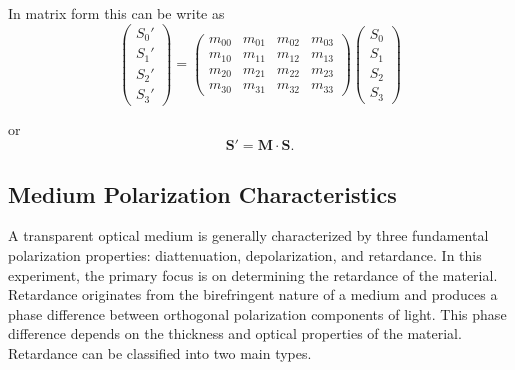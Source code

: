 In matrix form this can be write as 
\begin{equation}
\begin{pmatrix}
S_0' \\
S_1' \\
S_2' \\
S_3'
\end{pmatrix}
=
\begin{pmatrix}
m_{00} & m_{01} & m_{02} & m_{03} \\
m_{10} & m_{11} & m_{12} & m_{13} \\
m_{20} & m_{21} & m_{22} & m_{23} \\
m_{30} & m_{31} & m_{32} & m_{33}
\end{pmatrix}
\begin{pmatrix}
S_0 \\
S_1 \\
S_2 \\
S_3
\end{pmatrix}
\end{equation}

or
\begin{equation}
\mathbf{S}' = \mathbf{M}\cdot \mathbf{S}.
\end{equation}

\subsection{Medium Polarization Characteristics}

A transparent optical medium is generally characterized by three
fundamental polarization properties: diattenuation, depolarization, and retardance. In this experiment, the primary focus is on determining the retardance of the material. Retardance originates from the birefringent nature of a medium and produces a phase difference between orthogonal polarization components of light. This phase difference depends on the thickness and optical properties of the material. Retardance can be classified into two main types.

